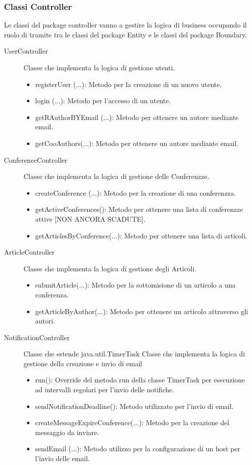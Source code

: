 \subsubsection{Classi Controller}
Le classi del package controller vanno a gestire la logica di business occupando il ruolo di tramite tra le classi del package Entity e le classi del package Boundary.
\begin{description}
\item[UserController] Classe che implementa la logica di gestione utenti.
    \begin{itemize}
        \item registerUser (...): Metodo per la creazione di un nuovo utente.
        \item login (...): Metodo per l'accesso di un utente.
        \item getRAuthorBYEmail (...): Metodo per ottenere un autore mediante email.
        \item getCooAuthors(...): Metodo per ottenere un autore mediante email.
    \end{itemize}
\item[ConferenceController] Classe che implementa la logica di gestione delle Conferenzze.
    \begin{itemize}
        \item createConference (...): Metodo per la creazione di una conferenzza.
        \item getActiveConferences(): Metodo per ottenere una lista di conferenzze attive [NON ANCORA SCADUTE].
        \item getArticlesByConference(...): Metodo per ottenere una lista di articoli.
    \end{itemize}
\item[ArticleController] Classe che implementa la logica di gestione degli Articoli.
    \begin{itemize}
        \item submitArticle(...): Metodo per la sottomisione di un articolo a una conferenza.
        \item getArticleByAuthor(...): Metodo per ottenere un articolo attraverso gli autori.
    \end{itemize}
\item[NotificationController] Classe che estende java.util.TimerTask Classe che implementa la logica di gestione della creazione e invio di email
    \begin{itemize}
        \item run(): Override del metodo run della classe TimerTask per esecuzione ad intervalli regolari per l'invio delle notifiche.
        \item sendNotificationDeadline(): Metodo utilizzato per l'invio di email.
        \item createMessageExpireConference(...): Metodo per la creazione del messaggio da inviare.
        \item sendEmail (...): Metodo utilizzo per la configurazione di un host per l'invio delle email.
    \end{itemize}
\end{description}
